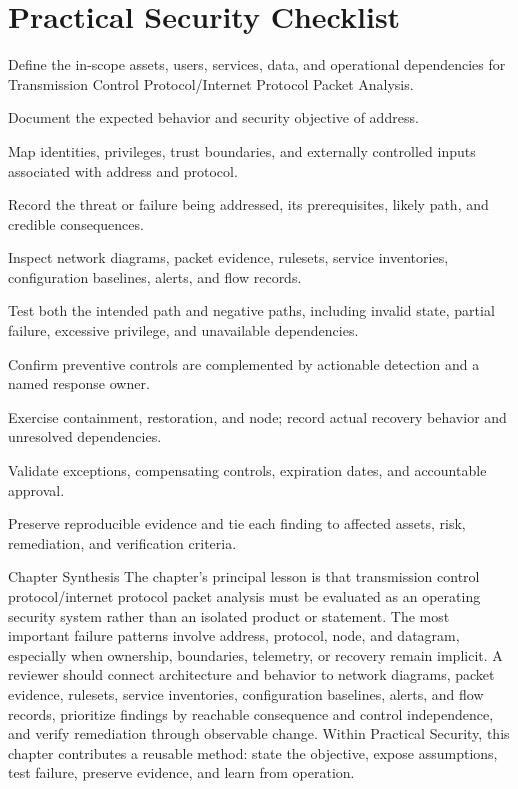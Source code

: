 \documentclass[11pt,letterpaper]{article}
\begin{document}
\section*{Practical Security Checklist}
\begin{CornellChecklist}
\item Define the in-scope assets, users, services, data, and operational dependencies for Transmission Control Protocol/Internet Protocol Packet Analysis.
\item Document the expected behavior and security objective of address.
\item Map identities, privileges, trust boundaries, and externally controlled inputs associated with address and protocol.
\item Record the threat or failure being addressed, its prerequisites, likely path, and credible consequences.
\item Inspect network diagrams, packet evidence, rulesets, service inventories, configuration baselines, alerts, and flow records.
\item Test both the intended path and negative paths, including invalid state, partial failure, excessive privilege, and unavailable dependencies.
\item Confirm preventive controls are complemented by actionable detection and a named response owner.
\item Exercise containment, restoration, and node; record actual recovery behavior and unresolved dependencies.
\item Validate exceptions, compensating controls, expiration dates, and accountable approval.
\item Preserve reproducible evidence and tie each finding to affected assets, risk, remediation, and verification criteria.
\end{CornellChecklist}
\begin{CornellSummaryBox}{Chapter Synthesis}
The chapter's principal lesson is that transmission control protocol/internet protocol packet analysis must be evaluated as an operating security system rather than an isolated product or statement. The most important failure patterns involve address, protocol, node, and datagram, especially when ownership, boundaries, telemetry, or recovery remain implicit. A reviewer should connect architecture and behavior to network diagrams, packet evidence, rulesets, service inventories, configuration baselines, alerts, and flow records, prioritize findings by reachable consequence and control independence, and verify remediation through observable change. Within Practical Security, this chapter contributes a reusable method: state the objective, expose assumptions, test failure, preserve evidence, and learn from operation.
\end{CornellSummaryBox}
\end{document}
